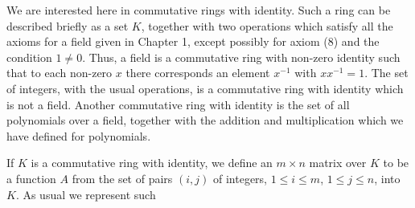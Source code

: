We are interested here in commutative rings with identity. Such a ring can be described briefly as a set \(K\), together with two operations which satisfy all the axioms for a field given in Chapter 1, except possibly for axiom (8) and the condition \(1\neq 0\). Thus, a field is a commutative ring with non-zero identity such that to each non-zero \(x\) there corresponds an element \(x^{-1}\) with \(xx^{-1}=1\). The set of integers, with the usual operations, is a commutative ring with identity which is not a field. Another commutative ring with identity is the set of all polynomials over a field, together with the addition and multiplication which we have defined for polynomials.

If \(K\) is a commutative ring with identity, we define an \(m\times n\) matrix over \(K\) to be a function \(A\) from the set of pairs \((i,j)\) of integers, \(1\leq i\leq m\), \(1\leq j\leq n\), into \(K\). As usual we represent such 